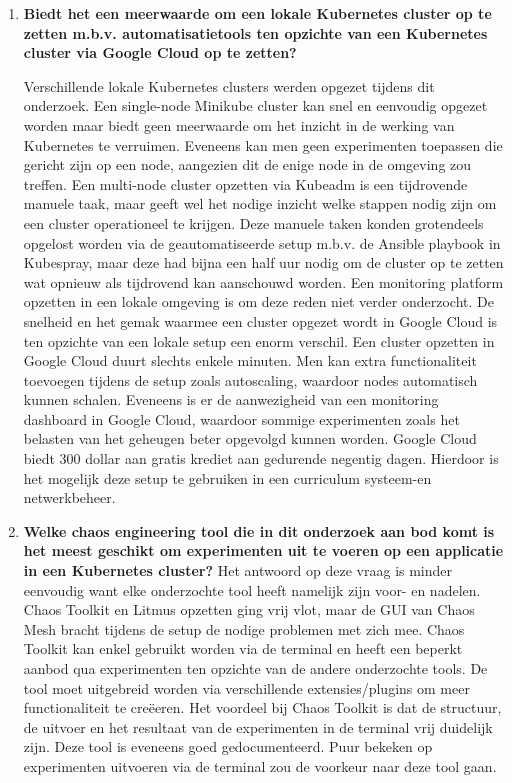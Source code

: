 \begin{enumerate}
\item {\bf Biedt het een meerwaarde om een lokale Kubernetes cluster op te zetten m.b.v. automatisatietools ten opzichte van een Kubernetes cluster via Google Cloud op te zetten?}

Verschillende lokale Kubernetes clusters werden opgezet tijdens dit onderzoek. Een single-node Minikube cluster kan snel en eenvoudig opgezet worden maar biedt geen meerwaarde om het inzicht in de werking van Kubernetes te verruimen. Eveneens kan men geen experimenten toepassen die gericht zijn op een node, aangezien dit de enige node in de omgeving zou treffen. Een multi-node cluster opzetten via Kubeadm is een tijdrovende manuele taak, maar geeft wel het nodige inzicht welke stappen nodig zijn om een cluster operationeel te krijgen. Deze manuele taken konden grotendeels opgelost worden via de geautomatiseerde setup m.b.v. de Ansible playbook in Kubespray, maar deze had bijna een half uur nodig om de cluster op te zetten wat opnieuw als tijdrovend kan aanschouwd worden. Een monitoring platform opzetten in een lokale omgeving is om deze reden niet verder onderzocht.
\newline De snelheid en het gemak waarmee een cluster opgezet wordt in Google Cloud is ten opzichte van een lokale setup een enorm verschil. Een cluster opzetten in Google Cloud duurt slechts enkele minuten. Men kan extra functionaliteit toevoegen tijdens de setup zoals autoscaling, waardoor nodes automatisch kunnen schalen. Eveneens is er de aanwezigheid van een monitoring dashboard in Google Cloud, waardoor sommige experimenten zoals het belasten van het geheugen beter opgevolgd kunnen worden. Google Cloud biedt 300 dollar aan gratis krediet aan gedurende negentig dagen. Hierdoor is het mogelijk deze setup te gebruiken in een curriculum systeem-en netwerkbeheer.     
\newline 
\item {\bf Welke chaos engineering tool die in dit onderzoek aan bod komt is het meest geschikt om experimenten uit te voeren op een applicatie in een Kubernetes cluster?}
\newline Het antwoord op deze vraag is minder eenvoudig want elke onderzochte tool heeft namelijk zijn voor- en nadelen. Chaos Toolkit en Litmus opzetten ging vrij vlot, maar de GUI van Chaos Mesh bracht tijdens de setup de nodige problemen met zich mee. Chaos Toolkit kan enkel gebruikt worden via de terminal en heeft een beperkt aanbod qua experimenten ten opzichte van de andere onderzochte tools. De tool moet uitgebreid worden via verschillende extensies/plugins om meer functionaliteit te creëeren. Het voordeel bij Chaos Toolkit is dat de structuur, de uitvoer en het resultaat van de experimenten in de terminal vrij duidelijk zijn. Deze tool is eveneens goed gedocumenteerd. Puur bekeken op experimenten uitvoeren via de terminal zou de voorkeur naar deze tool gaan.

\end{enumerate}
